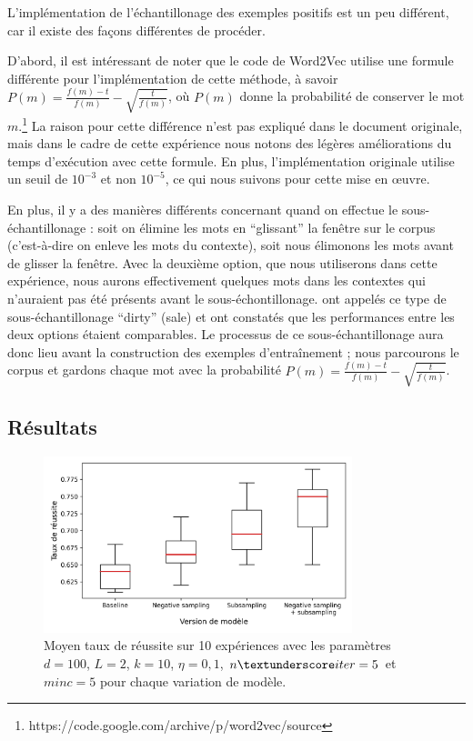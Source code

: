 \documentclass[12pt]{article}
\begin{document}
L'implémentation de l'échantillonage des exemples positifs est un peu différent, car il existe des façons différentes de procéder.

D'abord, il est intéressant de noter que le code de Word2Vec utilise une formule différente pour l'implémentation de cette méthode, à savoir $ P(m) = \frac{f(m)-t}{f(m)} - \sqrt{\frac{t}{f(m)}} $, où $P(m)$ donne la probabilité de conserver le mot $m$.\footnote{https://code.google.com/archive/p/word2vec/source} La raison pour cette différence n'est pas expliqué dans le document originale, mais dans le cadre de cette expérience nous notons des légères améliorations du temps d'exécution avec cette formule. En plus, l'implémentation originale utilise un seuil de $10^{-3}$ et non $10^{-5}$, ce qui nous suivons pour cette mise en œuvre.

En plus, il y a des manières différents concernant quand on effectue le sous-échantillonage : soit on élimine les mots en ``glissant'' la fenêtre sur le corpus (c'est-à-dire on enleve les mots du contexte), soit nous élimonons les mots avant de glisser la fenêtre. Avec la deuxième option, que nous utiliserons dans cette expérience, nous aurons effectivement quelques mots dans les contextes qui n'auraient pas été présents avant le sous-échontillonage. \cite{levy2015improving} ont appelés ce type de sous-échantillonage ``dirty'' (sale) et ont constatés que les performances entre les deux options étaient comparables. Le processus de ce sous-échantillonage aura donc lieu avant la construction des exemples d'entraînement ; nous parcourons le corpus et gardons chaque mot avec la probabilité $ P(m) = \frac{f(m)-t}{f(m)} - \sqrt{\frac{t}{f(m)}} $.

\subsection{Résultats} \label{résultats-1}

\begin{figure}[htpb]
    \centering
    \includegraphics[width=0.8\textwidth]{img/boxplot.png}
    \caption{Moyen taux de réussite sur 10 expériences avec les paramètres $d=100$, $L=2$, $k=10$, $\eta=0{,}1$, $n\textunderscore iter=5$ et $minc=5$ pour chaque variation de modèle.}
    \label{fig:boxplot}
\end{figure}
\end{document}
